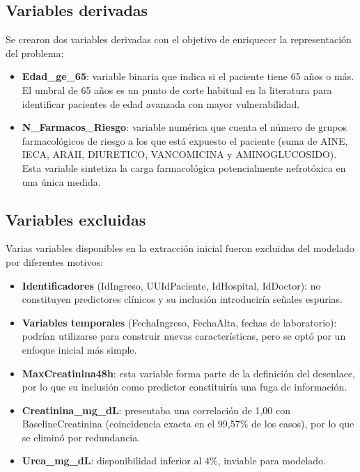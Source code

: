 \documentclass[12pt, a4paper, oneside]{report}
\begin{document}
\subsection{Variables derivadas}

Se crearon dos variables derivadas con el objetivo de enriquecer la representación del problema:

\begin{itemize}
    \item \textbf{Edad\_ge\_65}: variable binaria que indica si el paciente tiene 65 años o más. El umbral de 65 años es un punto de corte habitual en la literatura para identificar pacientes de edad avanzada con mayor vulnerabilidad.
    \item \textbf{N\_Farmacos\_Riesgo}: variable numérica que cuenta el número de grupos farmacológicos de riesgo a los que está expuesto el paciente (suma de AINE, IECA, ARAII, DIURETICO, VANCOMICINA y AMINOGLUCOSIDO). Esta variable sintetiza la carga farmacológica potencialmente nefrotóxica en una única medida.
\end{itemize}

\subsection{Variables excluidas}

Varias variables disponibles en la extracción inicial fueron excluidas del modelado por diferentes motivos:

\begin{itemize}
    \item \textbf{Identificadores} (IdIngreso, UUIdPaciente, IdHospital, IdDoctor): no constituyen predictores clínicos y su inclusión introduciría señales espurias.
    \item \textbf{Variables temporales} (FechaIngreso, FechaAlta, fechas de laboratorio): podrían utilizarse para construir nuevas características, pero se optó por un enfoque inicial más simple.
    \item \textbf{MaxCreatinina48h}: esta variable forma parte de la definición del desenlace, por lo que su inclusión como predictor constituiría una fuga de información.
    \item \textbf{Creatinina\_mg\_dL}: presentaba una correlación de 1,00 con BaselineCreatinina (coincidencia exacta en el 99,57\% de los casos), por lo que se eliminó por redundancia.
    \item \textbf{Urea\_mg\_dL}: disponibilidad inferior al 4\%, inviable para modelado.
\end{itemize}
\end{document}
